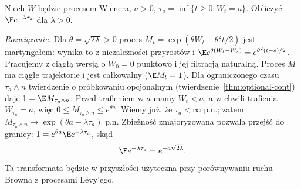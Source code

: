 \begin{zadanie}
Niech $W$ będzie procesem Wienera, $a>0$,
$\tau_a=\inf\{t\ge0:W_t=a\}$.
Obliczyć $\E e^{-\lambda\tau_a}$ dla $\lambda>0$.

\emph{Rozwiązanie.} Dla $\theta=\sqrt{2\lambda}>0$
proces $M_t=\exp(\theta W_t-\theta^2t/2)$
jest martyngałem: wynika to z niezależności przyrostów i
$\E e^{\theta(W_t-W_s)}=e^{\theta^2(t-s)/2}$.
Pracujemy z ciągłą wersją o $W_0=0$ punktowo
i jej filtracją naturalną. Proces $M$ ma ciągłe
trajektorie i jest całkowalny ($\E M_t=1$).
Dla ograniczonego czasu $\tau_a\wedge n$ twierdzenie o
próbkowaniu opcjonalnym (twierdzenie~\ref{thm:optional-cont}) daje
$1=\E M_{\tau_a\wedge n}$.
Przed trafieniem w $a$ mamy $W_t<a$, a w chwili
trafienia $W_{\tau_a}=a$, więc
$0\le M_{\tau_a\wedge n}\le e^{\theta a}$.
Wiemy już, że $\tau_a<\infty$ p.n.; zatem
$M_{\tau_a\wedge n}\to\exp(\theta a-\lambda\tau_a)$
p.n. Zbieżność zmajoryzowana pozwala przejść do granicy:
$1=e^{\theta a}\E e^{-\lambda\tau_a}$, skąd
\[
\E e^{-\lambda\tau_a}=e^{-a\sqrt{2\lambda}}.
\]
Ta transformata będzie w przyszłości użyteczna przy
porównywaniu ruchu Browna z procesami Lévy'ego.
\end{zadanie}

